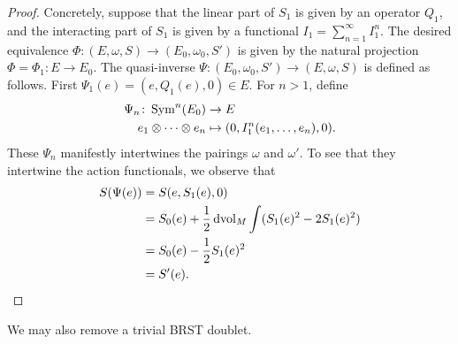 \documentclass[10pt, oneside]{article}
\begin{document}
\begin{proof}
Concretely, suppose that the linear part of $S_1$ is given by an operator $Q_1$, and the interacting part of $S_1$ is given by a functional $I_1 = \sum_{n=1}^\infty I_1^n$.  
The desired equivalence $\Phi : (E, \omega, S) \to (E_0, \omega_0, S')$ is given by the natural projection $\Phi = \Phi_1 : E \to E_0$. 
The quasi-inverse $\Psi : (E_0, \omega_0, S') \to (E, \omega, S)$ is defined as follows.
First $\Psi_1(e) = (e, Q_1(e), 0) \in E$.
For $n > 1$, define
\begin{align*}
\Psi_n \colon \operatorname{Sym}^n(E_0) &\to E \\
e_1 \otimes \cdots \otimes e_n &\mapsto (0, I_1^n(e_1, \ldots, e_n), 0).
\end{align*}
These $\Psi_n$ manifestly intertwines the pairings $\omega$ and $\omega'$.  
To see that they intertwine the action functionals, we observe that 
\begin{align*}
S(\Psi(e)) &= S(e, S_1(e), 0) \\
&= S_0(e) + \frac 12 \operatorname{dvol}_M \int (S_1(e)^2 - 2 S_1(e)^2) \\
&= S_0(e) - \frac 12 S_1(e)^2 \\
&= S'(e).
\end{align*}
\end{proof}

We may also remove a trivial BRST doublet.

\end{document}
